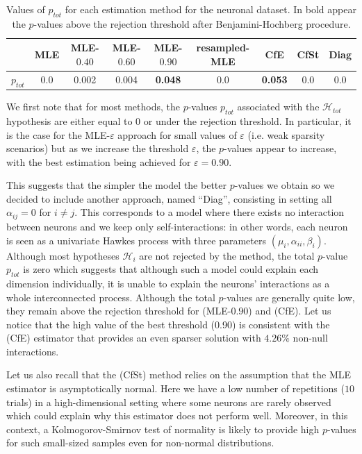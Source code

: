     \begin{table}[!ht] 
    \begin{center}
    \setlength{\tabcolsep}{2pt}
    \centering
    \begin{tabular}{c|c|ccc|ccc|c}
          & MLE & MLE-$0.40$ & MLE-$0.60$ & MLE-$0.90$ & resampled-MLE & CfE & CfSt & Diag\\
         \toprule
         $p_{tot}$ & 0.0 & 0.002 & 0.004 & \textbf{0.048} & 0.0 & \textbf{0.053} & 0.0 & 0.0
    \end{tabular}
    \caption{Values of $p_{tot}$ for each estimation method for the neuronal dataset. In bold appear the \(p\)-values above the rejection threshold after Benjamini-Hochberg procedure.}
    \label{tab:chap2_p_tot_neurons}
    \end{center}
    \end{table}
    
 We first note that for most methods, the $p$-values $p_{tot}$ associated with the  $\mathcal{H}_{tot}$ hypothesis are either equal to 0 or under the rejection threshold. In particular, it is the case for the MLE-$\varepsilon$ approach for small values of $\varepsilon$ (i.e. weak sparsity scenarios) but as we increase the threshold $\varepsilon$, the $p$-values appear to increase, with the best estimation being achieved for $\varepsilon = 0.90$.
 
 This suggests that the simpler the model the better $p$-values we obtain so we decided to include another approach, named ``Diag'', consisting in setting all $\alpha_{ij} = 0$ for $i \neq j$. This corresponds to a model where there exists no interaction between neurons and we keep only self-interactions: in other words, each neuron is seen as a univariate Hawkes process with three parameters $(\mu_i,\alpha_{ii}, \beta_i)$. Although most hypotheses $\mathcal{H}_i$ are not rejected by the method, the total $p$-value $p_{tot}$ is zero which suggests that although such a model could explain each dimension individually, it is unable to explain the neurons' interactions as a whole interconnected process.
Although the total $p$-values are generally quite low, they remain above the rejection threshold for (MLE-$0.90$) and (CfE).
Let us notice that the high value of the best threshold (0.90) is consistent with the (CfE) estimator that provides an even sparser solution with $4.26\%$ non-null interactions. 

Let us also recall that the (CfSt) method relies on the assumption that the MLE estimator is asymptotically normal. Here we have a low number of repetitions ($10$ trials) in a high-dimensional setting where some neurons are rarely observed which could explain why this estimator does not perform well. Moreover, in this context, a Kolmogorov-Smirnov test of normality is likely to provide high $p$-values for such small-sized samples even for non-normal distributions.
 
